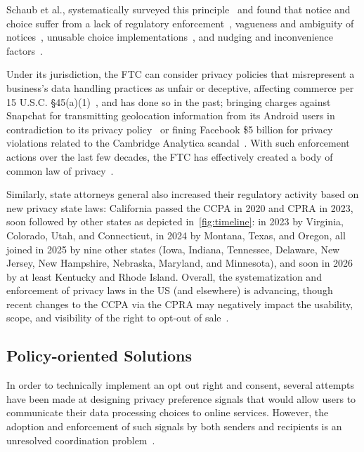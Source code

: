 Schaub et al., systematically surveyed this principle~\cite{schaubDesignSpaceEffective2015} and found that notice and choice suffer from a lack of regulatory enforcement~\cite{cranorNecessaryNotSufficient2012}, vagueness and ambiguity of notices~\cite{reidenbergAmbiguityPrivacyPolicies2016}, unusable choice implementations~\cite{habibItsScavengerHunt2020}, and nudging and inconvenience factors~\cite{oconnorUnclearInconspicuousRight2021}. 


Under its jurisdiction, the FTC can consider privacy policies that misrepresent a business's data handling practices as unfair or deceptive, affecting commerce per 15 U.S.C. §45(a)(1)~\cite{unitedstates:congress:houseofrepresentatives:officeofthelawrevisioncounselUnfairMethodsCompetition2023}, and has done so in the past; bringing charges against Snapchat for transmitting geolocation information from its Android users in contradiction to its privacy policy~\cite{ftcSnapchatSettlesFTC2014} or fining Facebook \$5 billion for privacy violations related to the Cambridge Analytica scandal~\cite{FTCImposes52019}. With such enforcement actions over the last few decades, the FTC has effectively created a body of common law of privacy~\cite{soloveFTCNewCommon2013}.  

Similarly, state attorneys general also increased their regulatory activity based on new privacy state laws: California passed the CCPA in 2020 and CPRA in 2023, soon followed by other states as depicted in~\autoref{fig:timeline}: in 2023 by Virginia, Colorado, Utah, and Connecticut, in 2024 by Montana, Texas, and Oregon, all joined in 2025 by nine other states (Iowa, Indiana, Tennessee, Delaware, New Jersey, New Hampshire, Nebraska, Maryland, and Minnesota), and soon in 2026 by at least Kentucky and Rhode Island. 
%
Overall, the systematization and enforcement of privacy laws in the US (and elsewhere) is advancing, though recent changes to the CCPA via the CPRA may negatively impact the usability, scope, and visibility of the right to opt-out of sale~\cite{charatanTwoStepsForward2024}.



\subsection{Policy-oriented Solutions}
\label{sec:policy-solutions}

In order to technically implement an opt out right and consent, several attempts have been made at designing privacy preference signals that would allow users to communicate their data processing choices to online services. However, the adoption and enforcement of such signals by both senders and recipients is an unresolved coordination problem~\cite{hilsPrivacyPreferenceSignals2021}.

